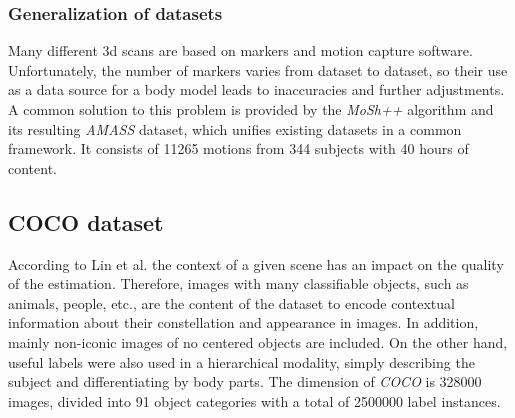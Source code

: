 \subsubsection{Generalization of datasets}
Many different 3d scans are based on markers and motion capture software. Unfortunately, the number of markers varies from dataset to dataset, so their use as a data source for a body model leads to inaccuracies and further adjustments. A common solution to this problem is provided by the \emph{MoSh++} algorithm and its resulting \emph{AMASS} dataset, which unifies existing datasets in a common framework. It consists of 11265 motions from 344 subjects with 40 hours of content.\cite{amass}

\subsection{COCO dataset} 
According to Lin et al. the context of a given scene has an impact on the quality of the estimation. Therefore, images with many classifiable objects, such as animals, people, etc., are the content of the dataset to encode contextual information about their constellation and appearance in images. In addition, mainly non-iconic images of no centered objects are included. On the other hand, useful labels were also used in a hierarchical modality, simply describing the subject and differentiating by body parts. The dimension of \emph{COCO} is 328000 images, divided into 91 object categories with a total of 2500000 label instances. \cite{coco}